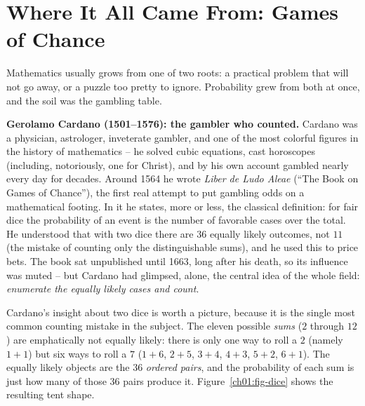 \section{Where It All Came From: Games of Chance}
\label{ch01:history}

Mathematics usually grows from one of two roots: a practical problem that will not
go away, or a puzzle too pretty to ignore. Probability grew from both at once, and
the soil was the gambling table.

\begin{historybox}
\textbf{Gerolamo Cardano (1501--1576): the gambler who counted.} Cardano was a
physician, astrologer, inveterate gambler, and one of the most colorful figures in
the history of mathematics -- he solved cubic equations, cast horoscopes (including,
notoriously, one for Christ), and by his own account gambled nearly every day for
decades. Around 1564 he wrote \emph{Liber de Ludo Aleae} (``The Book on Games of
Chance''), the first real attempt to put gambling odds on a mathematical footing.
In it he states, more or less, the classical definition: for fair dice the
probability of an event is the number of favorable cases over the total. He
understood that with two dice there are $36$ equally likely outcomes, not $11$
(the mistake of counting only the distinguishable sums), and he used this to price
bets. The book sat unpublished until 1663, long after his death, so its influence
was muted -- but Cardano had glimpsed, alone, the central idea of the whole field:
\emph{enumerate the equally likely cases and count}.
\end{historybox}

Cardano's insight about two dice is worth a picture, because it is the single most
common counting mistake in the subject. The eleven possible \emph{sums} ($2$
through $12$) are emphatically not equally likely: there is only one way to roll a
$2$ (namely $1{+}1$) but six ways to roll a $7$ ($1{+}6$, $2{+}5$, $3{+}4$,
$4{+}3$, $5{+}2$, $6{+}1$). The equally likely objects are the $36$ \emph{ordered
pairs}, and the probability of each sum is just how many of those $36$ pairs
produce it. Figure~\ref{ch01:fig-dice} shows the resulting tent shape.

